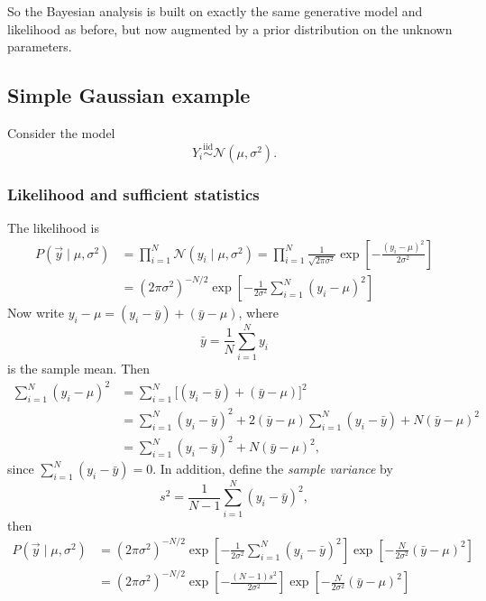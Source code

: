 \documentclass[11pt, titlepage]{article} %
\numberwithin{equation}{section}
\theoremstyle{definition}
\numberwithin{assumption}{section}
\begin{document}
So the Bayesian analysis is built on exactly the same generative model and likelihood as before, but now augmented by a prior distribution on the unknown parameters.





\subsection{Simple Gaussian example}\label{subsection:simple_gaussian_example}

Consider the model
\begin{equation*}
    Y_i \overset{\mathrm{iid}}{\sim} \mathcal{N}(\mu,\sigma^2).
\end{equation*}

\subsubsection*{Likelihood and sufficient statistics}

The likelihood is
\begin{align*}
    P(\vec y\mid \mu,\sigma^2)
    &=
    \prod_{i=1}^N \mathcal{N}(y_i\mid \mu,\sigma^2)
    =
    \prod_{i=1}^N \frac{1}{\sqrt{2\pi\sigma^2}}
    \exp\!\left[-\frac{(y_i-\mu)^2}{2\sigma^2}\right]\\
    &=
    (2\pi\sigma^2)^{-N/2}
    \exp\!\left[-\frac{1}{2\sigma^2}\sum_{i=1}^N (y_i-\mu)^2\right]
\end{align*}
Now write $y_i-\mu=(y_i-\bar y)+(\bar y-\mu)$, where
\begin{equation*}
    \bar y=\frac{1}{N}\sum_{i=1}^N y_i
\end{equation*}
is the sample mean. Then
\begin{align*}
    \sum_{i=1}^N (y_i-\mu)^2
    &=
    \sum_{i=1}^N \bigl[(y_i-\bar y)+(\bar y-\mu)\bigr]^2\\
    &=
    \sum_{i=1}^N (y_i-\bar y)^2
    +2(\bar y-\mu)\sum_{i=1}^N (y_i-\bar y)
    +N(\bar y-\mu)^2\\
    &=
    \sum_{i=1}^N (y_i-\bar y)^2
    +N(\bar y-\mu)^2,
\end{align*}
since $\sum_{i=1}^N (y_i-\bar y)=0$. In addition, define the \textit{sample variance} by
\begin{equation*}
    s^2=\frac{1}{N-1}\sum_{i=1}^N (y_i-\bar y)^2,
\end{equation*}
then
\begin{align*}
    P(\vec y\mid \mu,\sigma^2)
    &=
    (2\pi\sigma^2)^{-N/2}
    \exp\!\left[-\frac{1}{2\sigma^2}\sum_{i=1}^N (y_i-\bar y)^2\right]
    \exp\!\left[-\frac{N}{2\sigma^2}(\bar y-\mu)^2\right]\\
    &=
    (2\pi\sigma^2)^{-N/2}
    \exp\!\left[-\frac{(N-1)s^2}{2\sigma^2}\right]
    \exp\!\left[-\frac{N}{2\sigma^2}(\bar y-\mu)^2\right]
\end{align*}
\end{document}
